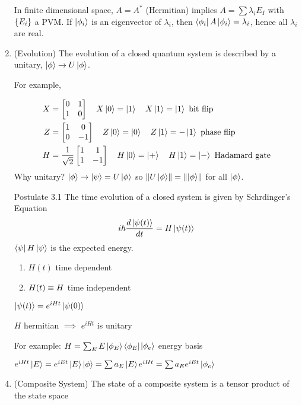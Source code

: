 \begin{enumerate}[label=Postulate \arabic*.]
          In finite dimensional space, $A = A^*$ (Hermitian) implies $A = \sum \lambda_i E_I$
          with $\left\lbrace E_i\right\rbrace$ a PVM. If $\left|\phi_i\right\rangle$ is an eigenvector of $\lambda_i$, then
          $\left\langle \phi_i\right|A\left|\phi_i\right\rangle = \lambda_i$, hence all $\lambda_i$ are real.
    \item (Evolution) The evolution of a closed quantum system is described by a unitary, $\left|\phi\right\rangle \to U\left|\phi\right\rangle$.

          For example,

          \begin{align*}
              X & = \begin{bmatrix}0 & 1\\1&0\end{bmatrix}\quad X\left|0\right\rangle = \left|1\right\rangle \quad X\left|1\right\rangle = \left|1\right\rangle \hbox{ bit flip}                        \\
              Z & = \begin{bmatrix}1 & 0\\0&-1\end{bmatrix}\quad Z\left|0\right\rangle = \left|0\right\rangle \quad Z\left|1\right\rangle = -\left|1\right\rangle \hbox{ phase flip}                     \\
              H & = \frac{1}{\sqrt{2}}\begin{bmatrix}1 & 1\\1&-1\end{bmatrix}\quad H\left|0\right\rangle = \left|+\right\rangle \quad H\left|1\right\rangle = \left|-\right\rangle \hbox{ Hadamard gate}
          \end{align*}
          Why unitary? $\left|\phi\right\rangle \to \left|\psi\right\rangle = U\left|\phi\right\rangle$ so $\left\lVert U\left|\phi\right\rangle\right\rVert = \left\lVert\left|\phi\right\rangle\right\rVert$ for all $\left|\phi\right\rangle$.

    \item[Postulate 3.1] The time evolution of a closed system is given by Schrdinger's Equation
        \[i\hbar \frac{d\left|\psi(t)\right\rangle}{dt} = H\left|\psi(t)\right\rangle\]
        $\left\langle \psi\right|H\left|\psi\right\rangle$ is the expected energy.
        \begin{enumerate}[label=\arabic*)]
            \item $H(t)$ time dependent
            \item $H(t) \equiv H$ time independent
        \end{enumerate}
        $\left|\psi(t)\right\rangle = e^{iHt}\left|\psi(0)\right\rangle$

        $H$ hermitian $\implies$ $e^{iHt}$ is unitary

        For example: $H = \sum_{E} E\left|\phi_E\right\rangle\left\langle \phi_E\right|$\quad $\left|\phi_e\right\rangle$ energy basis

        $e^{iHt}\left|E\right\rangle = e^{iEt}\left|E\right\rangle$\quad$\left|\phi\right\rangle = \sum a_E \left|E\right\rangle$\quad $e^{iHt} = \sum a_E e^{iEt}\left|\phi_e\right\rangle$
    \item (Composite System) The state of a composite system is a tensor product
          of the state space
\end{enumerate}

